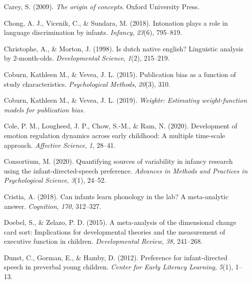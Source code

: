 \documentclass[
  man]{apa6}
\newlength{\cslhangindent}
\newlength{\cslentryspacingunit} %
\newenvironment{CSLReferences}[2] %
 {%
  \setlength{\parindent}{0pt}
  \ifodd #1
  \let\oldpar\par
  \def\par{\hangindent=\cslhangindent\oldpar}
  \fi
  \setlength{\parskip}{#2\cslentryspacingunit}
 }%
 {}
\begin{document}
\begin{CSLReferences}{1}{0}
\leavevmode{}%
Carey, S. (2009). \emph{The origin of concepts}. Oxford University Press.

\leavevmode{}%
Chong, A. J., Vicenik, C., \& Sundara, M. (2018). Intonation plays a role in language discrimination by infants. \emph{Infancy}, \emph{23}(6), 795--819.

\leavevmode{}%
Christophe, A., \& Morton, J. (1998). Is dutch native english? Linguistic analysis by 2-month-olds. \emph{Developmental Science}, \emph{1}(2), 215--219.

\leavevmode{}%
Coburn, Kathleen M., \& Vevea, J. L. (2015). Publication bias as a function of study characteristics. \emph{Psychological Methods}, \emph{20}(3), 310.

\leavevmode{}%
Coburn, Kathleen M., \& Vevea, J. L. (2019). \emph{Weightr: Estimating weight-function models for publication bias}.

\leavevmode{}%
Cole, P. M., Lougheed, J. P., Chow, S.-M., \& Ram, N. (2020). Development of emotion regulation dynamics across early childhood: A multiple time-scale approach. \emph{Affective Science}, \emph{1}, 28--41.

\leavevmode{}%
Consortium, M. (2020). Quantifying sources of variability in infancy research using the infant-directed-speech preference. \emph{Advances in Methods and Practices in Psychological Science}, \emph{3}(1), 24--52.

\leavevmode{}%
Cristia, A. (2018). Can infants learn phonology in the lab? A meta-analytic answer. \emph{Cognition}, \emph{170}, 312--327.

\leavevmode{}%
Doebel, S., \& Zelazo, P. D. (2015). A meta-analysis of the dimensional change card sort: Implications for developmental theories and the measurement of executive function in children. \emph{Developmental Review}, \emph{38}, 241--268.

\leavevmode{}%
Dunst, C., Gorman, E., \& Hamby, D. (2012). Preference for infant-directed speech in preverbal young children. \emph{Center for Early Literacy Learning}, \emph{5}(1), 1--13.


\end{CSLReferences}
\end{document}
